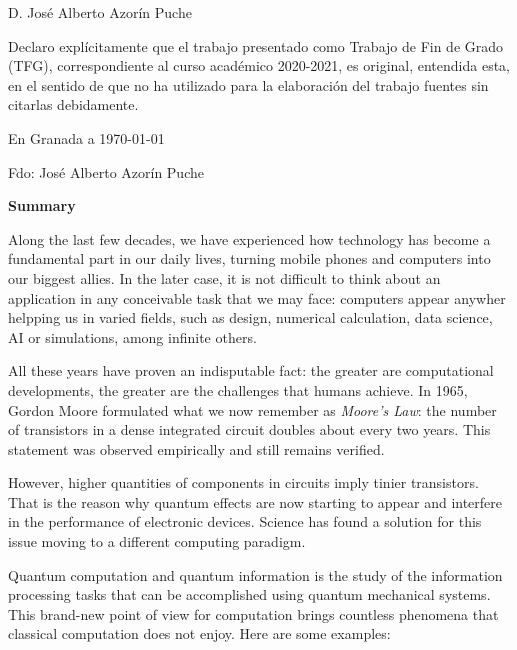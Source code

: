\documentclass[11pt,a4paper,twoside,pdf]{article}
\numberwithin{equation}{section}
\newcommand{\miNombre}{José Alberto Azorín Puche}
\newcommand{\miCurso}{2020-2021}
\begin{document}
D. \miNombre \\\medskip

Declaro explícitamente que el trabajo presentado como Trabajo de Fin de Grado (TFG), correspondiente al curso académico \miCurso, es original, entendida esta, en el sentido de que no ha utilizado para la elaboración del trabajo fuentes sin citarlas debidamente.
\medskip

En Granada a \today
\begin{flushleft}
Fdo: \miNombre

\end{flushleft}

\vfill

\newpage

\begin{center}

	
{\bf Summary}
\bigskip

\begin{minipage}{0.8\linewidth}
Along the last few decades, we have experienced how technology has become a fundamental part in our daily lives, turning mobile phones and computers into our biggest allies. In the later case, it is not difficult to think about an application in any conceivable task that we may face: computers appear anywher helpping us in varied fields, such as design, numerical calculation, data science, AI or simulations, among infinite others.

All these years have proven an indisputable fact: the greater are computational developments, the greater are the challenges that humans achieve. In 1965, Gordon Moore formulated what we now remember as \textit{Moore’s Law}: the number of transistors in a dense integrated circuit doubles about every two years. This statement was observed empirically and still remains verified.

However, higher quantities of components in circuits imply tinier transistors. That is the reason why quantum effects are now starting to appear and interfere in the performance of electronic devices. Science has found a solution for this issue moving to a different computing paradigm.

Quantum computation and quantum information is the study of the information processing tasks that can be accomplished using quantum mechanical systems. This brand-new point of view for computation brings countless phenomena that classical computation does not enjoy. Here are some examples:


\end{minipage}
\end{center}
\end{document}
